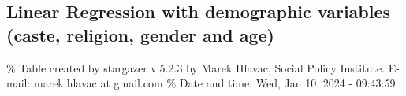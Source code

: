 \documentclass[
]{article}
\begin{document}
\begin{landscape}

\hypertarget{linear-regression-with-demographic-variables-caste-religion-gender-and-age}{%
\subsection{Linear Regression with demographic variables (caste,
religion, gender and
age)}\label{linear-regression-with-demographic-variables-caste-religion-gender-and-age}}

\begingroup\small\setlength{\tabcolsep}{1pt}\renewcommand{\arraystretch}{0.7}

\% Table created by stargazer v.5.2.3 by Marek Hlavac, Social Policy
Institute. E-mail: marek.hlavac at gmail.com \% Date and time: Wed, Jan
10, 2024 - 09:43:59


\end{landscape}
\end{document}
